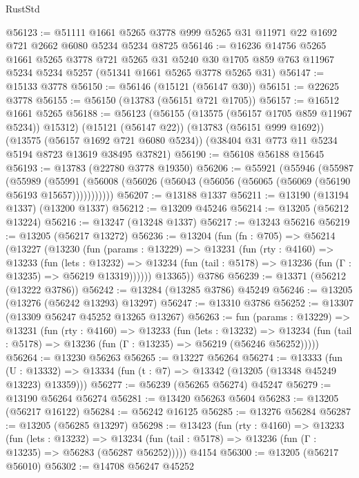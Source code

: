 \begin{lexlean}{RustStd}
\begin{coremodule}
@56123 := @51111
    @1661
    @5265
    @3778
    @999
    @5265
    @31
    @11971
    @22
    @1692
    @721
    @2662
    @6080
    @5234
    @5234
    @8725
@56146 := @16236
    @14756
    @5265
    @1661
    @5265
    @3778
    @721
    @5265
    @31
    @5240
    @30
    @1705
    @859
    @763
    @11967
    @5234
    @5234
    @5257
    (@51341 @1661 @5265 @3778 @5265 @31)
@56147 := @15133 @3778
@56150 := @56146 (@15121 (@56147 @30))
@56151 := @22625 @3778
@56155 := @56150 (@13783 (@56151 @721 @1705))
@56157 := @16512 @1661 @5265
@56188 := @56123
    (@56155 (@13575 (@56157 @1705 @859 @11967 @5234)) @15312)
    (@15121 (@56147 @22))
    (@13783 (@56151 @999 @1692))
    (@13575 (@56157 @1692 @721 @6080 @5234))
    (@38404 @31 @773 @11 @5234 @5194 @8723 @13619 @38495 @37821)
@56190 := @56108 @56188 @15645
@56193 := @13783 (@22780 @3778 @19350)
@56206 := @55921
    (@55946
      (@55987
        (@55989
          (@55991 (@56008 (@56026 (@56043 (@56056 (@56065 (@56069 (@56190 @56193 @15657)))))))))))
@56207 := @13188 @1337
@56211 := @13190 (@13194 @1337) (@13200 @1337)
@56212 := @13209 @45246
@56214 := @13205 (@56212 @13224)
@56216 := @13247 (@13248 @1337)
@56217 := @13243 @56216
@56219 := @13205 (@56217 @13272)
@56236 := @13204
    (fun (fn : @705) =>
    @56214
      (@13227
        (@13230
          (fun (params : @13229) =>
          @13231
            (fun (rty : @4160) =>
            @13233
              (fun (lets : @13232) =>
              @13234 (fun (tail : @5178) => @13236 (fun (Γ : @13235) => @56219 @13319))))))
        @13365))
    @3786
@56239 := @13371 (@56212 (@13222 @3786))
@56242 := @13284 (@13285 @3786) @45249
@56246 := @13205 (@13276 (@56242 @13293) @13297)
@56247 := @13310 @3786
@56252 := @13307 (@13309 @56247 @45252 @13265 @13267)
@56263 := fun (params : @13229) =>
  @13231
    (fun (rty : @4160) =>
    @13233
      (fun (lets : @13232) =>
      @13234 (fun (tail : @5178) => @13236 (fun (Γ : @13235) => @56219 (@56246 @56252)))))
@56264 := @13230 @56263
@56265 := @13227 @56264
@56274 := @13333
    (fun (U : @13332) => @13334 (fun (t : @7) => @13342 (@13205 (@13348 @45249 @13223) @13359)))
@56277 := @56239 (@56265 @56274) @45247
@56279 := @13190 @56264 @56274
@56281 := @13420 @56263 @5604
@56283 := @13205 (@56217 @16122)
@56284 := @56242 @16125
@56285 := @13276 @56284
@56287 := @13205 (@56285 @13297)
@56298 := @13423
    (fun (rty : @4160) =>
    @13233
      (fun (lets : @13232) =>
      @13234 (fun (tail : @5178) => @13236 (fun (Γ : @13235) => @56283 (@56287 @56252)))))
    @4154
@56300 := @13205 (@56217 @56010)
@56302 := @14708 @56247 @45252

\end{coremodule}
\end{lexlean}
